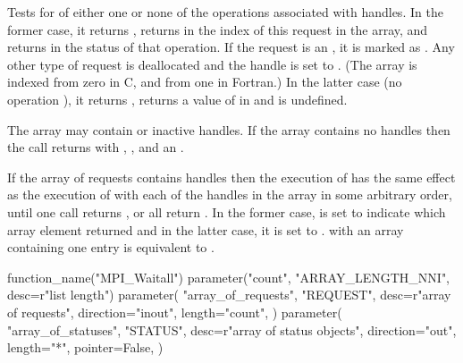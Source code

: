 Tests for  of
either one or none of the operations associated with  handles.
In the former case, it returns ,
returns in  the index of this request in the array,
and returns in  the status of that operation.  If
the request is an  , it is marked as .
Any other type of request
is deallocated
and the handle is set to .
(The array is indexed from zero in C, and from one in Fortran.)
In the latter case (no operation ),
it returns , returns a value
of  in  and  is
undefined.

The array may contain  or inactive handles.
If the
array contains no  handles then the call returns
 with ,
\mpicode{ = }, and an  .

If the array of requests contains  handles then
the execution of
has the same effect as the execution of
with each of the  handles in the array
in some arbitrary order, until one call returns , or
all return .  In the former case,  is set
to indicate which array element returned 
and in the latter case, it is set to .
 with an array containing one  entry
is equivalent to .

\begin{mpi-binding}
    function_name("MPI_Waitall")
    parameter("count", "ARRAY_LENGTH_NNI", desc=r"list length")
    parameter(
        "array_of_requests",
        "REQUEST",
        desc=r"array of requests",
        direction="inout",
        length="count",
    )
    parameter(
        "array_of_statuses",
        "STATUS",
        desc=r"array of status objects",
        direction="out",
        length="*",
        pointer=False,
    )
\end{mpi-binding}


